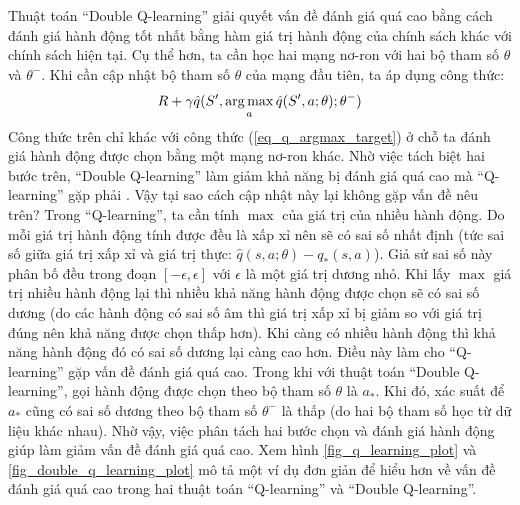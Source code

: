 	Thuật toán ``Double Q-learning'' giải quyết vấn đề đánh giá quá cao bằng cách đánh giá hành động tốt nhất bằng hàm giá trị hành động của chính sách khác với chính sách hiện tại.
	Cụ thể hơn, ta cần học hai mạng nơ-ron với hai bộ tham số $\theta$ và $\theta^{-}$.
	Khi cần cập nhật bộ tham số $\theta$ của mạng đầu tiên, ta áp dụng công thức:
	\begin{equation}
		\label{eq_dq_argmax_target}
		R + \gamma \hat{q}(S', \operatorname*{arg\,max}_{a}\hat{q}(S', a;\theta); \theta^{-})
	\end{equation}
	Công thức trên chỉ khác với công thức (\ref{eq_q_argmax_target}) ở chỗ ta đánh giá hành động được chọn bằng một mạng nơ-ron khác.
	Nhờ việc tách biệt hai bước trên, ``Double Q-learning'' làm giảm khả năng bị đánh giá quá cao mà ``Q-learning'' gặp phải \cite{hasselt2010double}.
	Vậy tại sao cách cập nhật này lại không gặp vấn đề nêu trên?
	Trong ``Q-learning'', ta cần tính $\max$ của giá trị của nhiều hành động.
	Do mỗi giá trị hành động tính được đều là xấp xỉ nên sẽ có sai số nhất định (tức sai số giữa giá trị xấp xỉ và giá trị thực: $\hat{q}(s, a;\theta) - q_{*}(s, a)$).
	Giả sử sai số này phân bố đều trong đoạn $[-\epsilon, \epsilon]$ với $\epsilon$ là một giá trị dương nhỏ.
	Khi lấy $\max$ giá trị nhiều hành động lại thì nhiều khả năng hành động được chọn sẽ có sai số dương (do các hành động có sai số âm thì giá trị xấp xỉ bị giảm so với giá trị đúng nên khả năng được chọn thấp hơn).
	Khi càng có nhiều hành động thì khả năng hành động đó có sai số dương lại càng cao hơn.
	Điều này làm cho ``Q-learning'' gặp vấn đề đánh giá quá cao.
	Trong khi với thuật toán ``Double Q-learning'', gọi hành động được chọn theo bộ tham số $\theta$ là $a_{*}$.
	Khi đó, xác suất để $a_{*}$ cũng có sai số dương theo bộ tham số $\theta^{-}$ là thấp (do hai bộ tham số học từ dữ liệu khác nhau).
	Nhờ vậy, việc phân tách hai bước chọn và đánh giá hành động giúp làm giảm vấn đề đánh giá quá cao.
	Xem hình \ref{fig_q_learning_plot} và \ref{fig_double_q_learning_plot} mô tả một ví dụ đơn giản để hiểu hơn về vấn đề đánh giá quá cao trong hai thuật toán ``Q-learning'' và ``Double Q-learning''.
